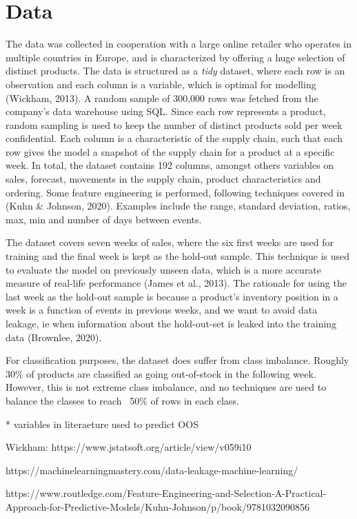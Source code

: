 \documentclass[../../main.tex]{subfiles}
\begin{document}

\chapter{Data}

The data was collected in cooperation with a large online retailer who operates in multiple countries in Europe, and is characterized by offering a huge selection of distinct products. The data is structured as a \textit{tidy} dataset, where each row is an observation and each column is a variable, which is optimal for modelling (Wickham, 2013). A random sample of 300,000 rows was fetched from the company's data warehouse using SQL. Since each row represents a product, random sampling is used to keep the number of distinct products sold per week confidential. Each column is a characteristic of the supply chain, such that each row gives the model a snapshot of the supply chain for a product at a specific week. In total, the dataset contains 192 columns, amongst others variables on sales, forecast, movements in the supply chain, product characteristics and ordering. Some feature engineering is performed, following techniques covered in (Kuhn & Johnson, 2020). Examples include the range, standard deviation, ratios, max, min and number of days between events. 

The dataset covers seven weeks of sales, where the six first weeks are used for training and the final week is kept as the hold-out sample. This technique is used to evaluate the model on previously unseen data, which is a more accurate measure of real-life performance (James et al., 2013). The rationale for using the last week as the hold-out sample is because a product's inventory position in a week is a function of events in previous weeks, and we want to avoid data leakage, ie when information about the hold-out-set is leaked into the training data (Brownlee, 2020).

For classification purposes, the dataset does suffer from class imbalance. Roughly 30\% of products are classified as going out-of-stock in the following week. However, this is not extreme class imbalance, and no techniques are used to balance the classes to reach ~50\% of rows in each class.

* variables in literaeture used to predict OOS

Wickham: https://www.jstatsoft.org/article/view/v059i10

https://machinelearningmastery.com/data-leakage-machine-learning/

https://www.routledge.com/Feature-Engineering-and-Selection-A-Practical-Approach-for-Predictive-Models/Kuhn-Johnson/p/book/9781032090856

\end{document}
